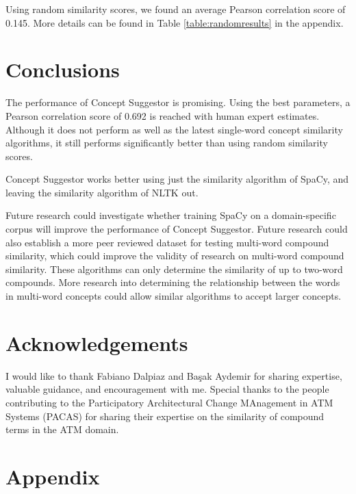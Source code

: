 \documentclass{article}
\begin{document}
Using random similarity scores, we found an average Pearson correlation score of 0.145. More details can be found in Table \ref{table:randomresults} in the appendix.

\section{Conclusions} \label{sec:conclusions}

The performance of Concept Suggestor is promising. Using the best parameters, a Pearson correlation score of 0.692 is reached with human expert estimates. Although it does not perform as well as the latest single-word concept similarity algorithms, it still performs significantly better than using random similarity scores. 

Concept Suggestor works better using just the similarity algorithm of SpaCy, and leaving the similarity algorithm of NLTK out.

Future research could investigate whether training SpaCy on a domain-specific corpus will improve the performance of Concept Suggestor. Future research could also establish a more peer reviewed dataset for testing multi-word compound similarity, which could improve the validity of research on multi-word compound similarity. These algorithms can only determine the similarity of up to two-word compounds. More research into determining the relationship between the words in multi-word concepts could allow similar algorithms to accept larger concepts.

\section{Acknowledgements} \label{sec:ack}

I would like to thank Fabiano Dalpiaz and Ba\c sak Aydemir for sharing expertise, valuable guidance, and encouragement with me. Special thanks to the people contributing to the Participatory Architectural Change MAnagement in ATM Systems (PACAS) for sharing their expertise on the similarity of compound terms in the ATM domain.

\printbibliography

\section{Appendix}
\end{document}
